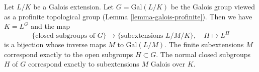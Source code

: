 %
\begin{theorem}
\label{theorem-inifinite-galois-theory}
Let $L/K$ be a Galois extension. Let $G = \text{Gal}(L/K)$
be the Galois group viewed as a profinite topological group
(Lemma \ref{lemma-galois-profinite}). Then we have $K = L^G$ and the map
$$
\{\text{closed subgroups of }G\}
\longrightarrow
\{\text{subextensions }L/M/K\},\quad
H \longmapsto L^H
$$
is a bijection whose inverse maps $M$ to $\text{Gal}(L/M)$.
The finite subextensions $M$ correspond exactly to the open
subgroups $H \subset G$. The normal closed subgroups $H$ of $G$
correspond exactly to subextensions $M$ Galois over $K$.
\end{theorem}

